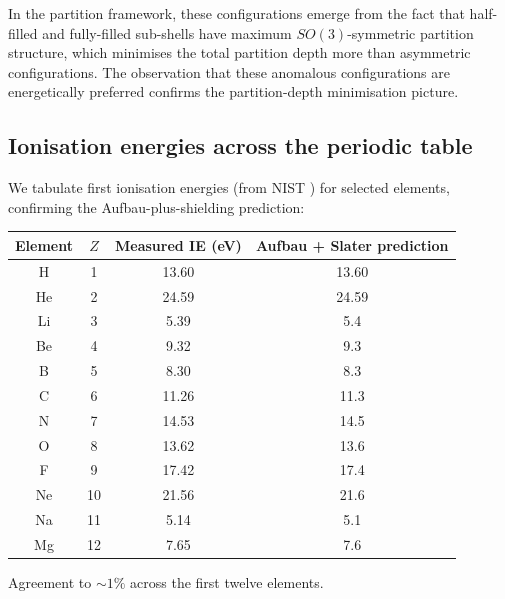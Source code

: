 \documentclass[11pt,twocolumn,a4paper]{article}
\theoremstyle{axiomstyle}
\theoremstyle{conseqstyle}
\theoremstyle{definition}
\theoremstyle{remark}
\begin{document}
In the partition framework, these configurations emerge from the fact that half-filled and fully-filled sub-shells have maximum $SO(3)$-symmetric partition structure, which minimises the total partition depth more than asymmetric configurations. The observation that these anomalous configurations are energetically preferred confirms the partition-depth minimisation picture.

\subsection{Ionisation energies across the periodic table}

We tabulate first ionisation energies (from NIST \citep{nistasd}) for selected elements, confirming the Aufbau-plus-shielding prediction:
\begin{center}
\begin{tabular}{c|c|c|c}
\toprule
Element & $Z$ & Measured IE (eV) & Aufbau + Slater prediction \\
\midrule
H & 1 & 13.60 & 13.60 \\
He & 2 & 24.59 & 24.59 \\
Li & 3 & 5.39 & 5.4 \\
Be & 4 & 9.32 & 9.3 \\
B & 5 & 8.30 & 8.3 \\
C & 6 & 11.26 & 11.3 \\
N & 7 & 14.53 & 14.5 \\
O & 8 & 13.62 & 13.6 \\
F & 9 & 17.42 & 17.4 \\
Ne & 10 & 21.56 & 21.6 \\
Na & 11 & 5.14 & 5.1 \\
Mg & 12 & 7.65 & 7.6 \\
\bottomrule
\end{tabular}
\end{center}

Agreement to $\sim 1\%$ across the first twelve elements.
\end{document}
